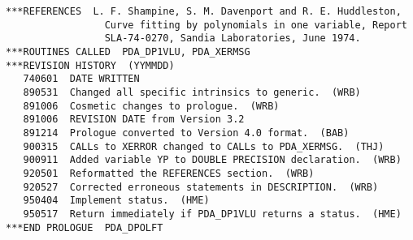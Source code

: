 \begin{verbatim}
***REFERENCES  L. F. Shampine, S. M. Davenport and R. E. Huddleston,
                 Curve fitting by polynomials in one variable, Report
                 SLA-74-0270, Sandia Laboratories, June 1974.
***ROUTINES CALLED  PDA_DP1VLU, PDA_XERMSG
***REVISION HISTORY  (YYMMDD)
   740601  DATE WRITTEN
   890531  Changed all specific intrinsics to generic.  (WRB)
   891006  Cosmetic changes to prologue.  (WRB)
   891006  REVISION DATE from Version 3.2
   891214  Prologue converted to Version 4.0 format.  (BAB)
   900315  CALLs to XERROR changed to CALLs to PDA_XERMSG.  (THJ)
   900911  Added variable YP to DOUBLE PRECISION declaration.  (WRB)
   920501  Reformatted the REFERENCES section.  (WRB)
   920527  Corrected erroneous statements in DESCRIPTION.  (WRB)
   950404  Implement status.  (HME)
   950517  Return immediately if PDA_DP1VLU returns a status.  (HME)
***END PROLOGUE  PDA_DPOLFT
\end{verbatim}



